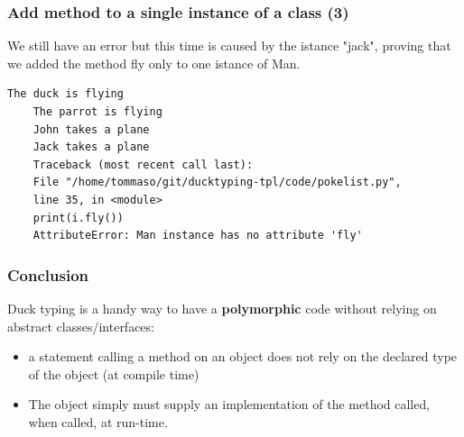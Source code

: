 \documentclass[xcolor ={table,usenames,dvipsnames}]{beamer}
\theoremstyle{definition}
\begin{document}
	\begin{frame}[fragile]
		\frametitle{Add method to a single instance of a class (3)}
			We still have an error but this time is caused by the istance "jack", proving that we added the method fly only to one istance of Man. 
		
		\begin{lstlisting}[keywordstyle=\color{black},
		commentstyle=\color{black},
		stringstyle=\color{black}.]
	The duck is flying
	The parrot is flying
	John takes a plane
	Jack takes a plane
	Traceback (most recent call last):
	File "/home/tommaso/git/ducktyping-tpl/code/pokelist.py",
	line 35, in <module>
	print(i.fly())
	AttributeError: Man instance has no attribute 'fly'
		\end{lstlisting}
	\end{frame}

\begin{frame}
	\frametitle{Conclusion}
	Duck typing is a handy way to have a \textbf{polymorphic} code without relying on abstract classes/interfaces:
	\begin{itemize}
		\item a statement calling a method on an object does not rely on the declared type of the object (at compile time)
		\item The object simply must supply an implementation of the method called, when called, at run-time. 
	\end{itemize}
\end{frame}



	

		
	
	

	
	
	
	
	
	
	
	
	
	
	
\end{document}
